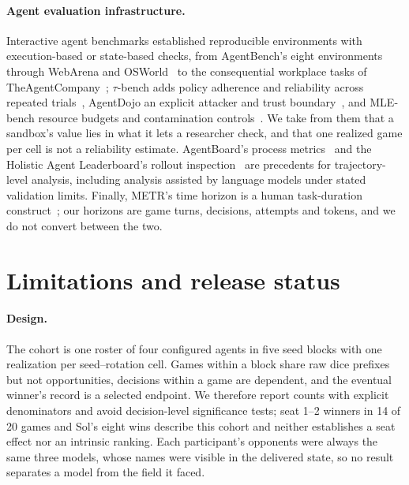 \paragraph{Agent evaluation infrastructure.} Interactive agent benchmarks established reproducible environments with execution-based or state-based checks, from AgentBench's eight environments~\cite{liu2024agentbench} through WebArena and OSWorld~\cite{zhou2024webarena,xie2024osworld} to the consequential workplace tasks of TheAgentCompany~\cite{xu2025theagentcompany}; $\tau$-bench adds policy adherence and reliability across repeated trials~\cite{yao2025taubench}, AgentDojo an explicit attacker and trust boundary~\cite{debenedetti2024agentdojo}, and MLE-bench resource budgets and contamination controls~\cite{chan2025mlebench}. We take from them that a sandbox's value lies in what it lets a researcher check, and that one realized game per cell is not a reliability estimate. AgentBoard's process metrics~\cite{ma2024agentboard} and the Holistic Agent Leaderboard's rollout inspection~\cite{kapoor2026hal} are precedents for trajectory-level analysis, including analysis assisted by language models under stated validation limits. Finally, METR's time horizon is a human task-duration construct~\cite{kwa2025timehorizons,metr2026page}; our horizons are game turns, decisions, attempts and tokens, and we do not convert between the two.

\section{Limitations and release status}
\label{sec:limitations}

\paragraph{Design.} The cohort is one roster of four configured agents in five seed blocks with one realization per seed--rotation cell. Games within a block share raw dice prefixes but not opportunities, decisions within a game are dependent, and the eventual winner's record is a selected endpoint. We therefore report counts with explicit denominators and avoid decision-level significance tests; seat 1--2 winners in 14 of 20 games and Sol's eight wins describe this cohort and neither establishes a seat effect nor an intrinsic ranking. Each participant's opponents were always the same three models, whose names were visible in the delivered state, so no result separates a model from the field it faced.

